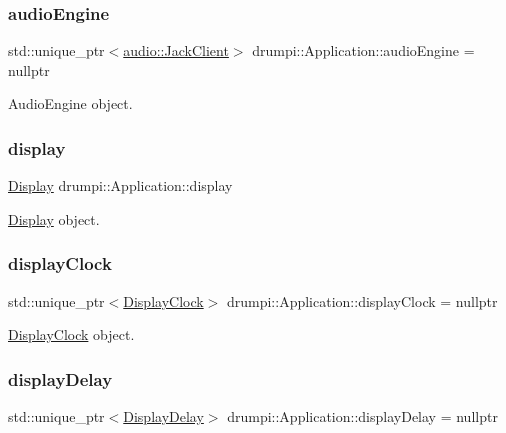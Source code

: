 \subsubsection{\texorpdfstring{audio\+Engine}{audioEngine}}
{\footnotesize\ttfamily std\+::unique\+\_\+ptr$<$\hyperlink{classdrumpi_1_1audio_1_1JackClient}{audio\+::\+Jack\+Client}$>$ drumpi\+::\+Application\+::audio\+Engine = nullptr}

Audio\+Engine object. \mbox{\label{classdrumpi_1_1Application_ad318b1bdecc292bbbf3a91cf832dd97a}} 
\subsubsection{\texorpdfstring{display}{display}}
{\footnotesize\ttfamily \hyperlink{classdrumpi_1_1Display}{Display} drumpi\+::\+Application\+::display}

\hyperlink{classdrumpi_1_1Display}{Display} object. \mbox{\label{classdrumpi_1_1Application_afaaa7672fa3f338283cf3b2c355272b0}} 
\subsubsection{\texorpdfstring{display\+Clock}{displayClock}}
{\footnotesize\ttfamily std\+::unique\+\_\+ptr$<$\hyperlink{classdrumpi_1_1DisplayClock}{Display\+Clock}$>$ drumpi\+::\+Application\+::display\+Clock = nullptr}

\hyperlink{classdrumpi_1_1DisplayClock}{Display\+Clock} object. \mbox{\label{classdrumpi_1_1Application_a86917e6bfed1be47bde5ea4929670d4b}} 
\subsubsection{\texorpdfstring{display\+Delay}{displayDelay}}
{\footnotesize\ttfamily std\+::unique\+\_\+ptr$<$\hyperlink{classdrumpi_1_1DisplayDelay}{Display\+Delay}$>$ drumpi\+::\+Application\+::display\+Delay = nullptr}

